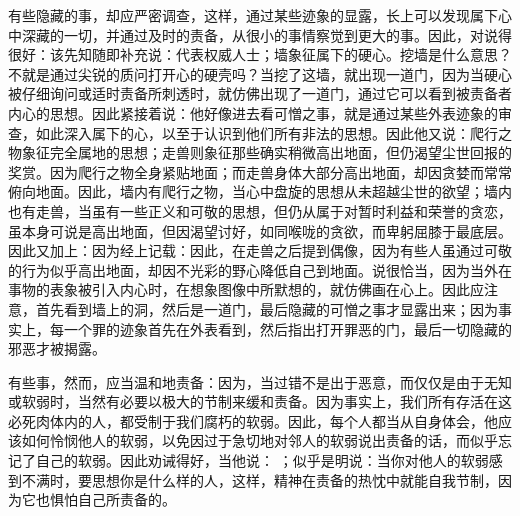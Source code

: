有些隐藏的事，却应严密调查，这样，通过某些迹象的显露，长上可以发现属下心中深藏的一切，并通过及时的责备，从很小的事情察觉到更大的事。因此，对说得很好：该先知随即补充说：代表权威人士；墙象征属下的硬心。挖墙是什么意思？不就是通过尖锐的质问打开心的硬壳吗？当挖了这墙，就出现一道门，因为当硬心被仔细询问或适时责备所刺透时，就仿佛出现了一道门，通过它可以看到被责备者内心的思想。因此紧接着说：他好像进去看可憎之事，就是通过某些外表迹象的审查，如此深入属下的心，以至于认识到他们所有非法的思想。因此他又说：爬行之物象征完全属地的思想；走兽则象征那些确实稍微高出地面，但仍渴望尘世回报的奖赏。因为爬行之物全身紧贴地面；而走兽身体大部分高出地面，却因贪婪而常常俯向地面。因此，墙内有爬行之物，当心中盘旋的思想从未超越尘世的欲望；墙内也有走兽，当虽有一些正义和可敬的思想，但仍从属于对暂时利益和荣誉的贪恋，虽本身可说是高出地面，但因渴望讨好，如同喉咙的贪欲，而卑躬屈膝于最底层。因此又加上：因为经上记载：因此，在走兽之后提到偶像，因为有些人虽通过可敬的行为似乎高出地面，却因不光彩的野心降低自己到地面。说很恰当，因为当外在事物的表象被引入内心时，在想象图像中所默想的，就仿佛画在心上。因此应注意，首先看到墙上的洞，然后是一道门，最后隐藏的可憎之事才显露出来；因为事实上，每一个罪的迹象首先在外表看到，然后指出打开罪恶的门，最后一切隐藏的邪恶才被揭露。\par

有些事，然而，应当温和地责备：因为，当过错不是出于恶意，而仅仅是由于无知或软弱时，当然有必要以极大的节制来缓和责备。因为事实上，我们所有存活在这必死肉体内的人，都受制于我们腐朽的软弱。因此，每个人都当从自身体会，他应该如何怜悯他人的软弱，以免因过于急切地对邻人的软弱说出责备的话，而似乎忘记了自己的软弱。因此劝诫得好，当他说： ；似乎是明说：当你对他人的软弱感到不满时，要思想你是什么样的人，这样，精神在责备的热忱中就能自我节制，因为它也惧怕自己所责备的。\par

